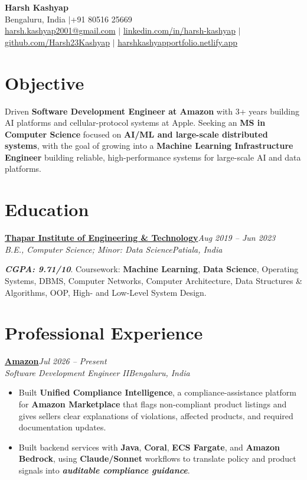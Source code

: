 \documentclass[10pt,a4paper]{article}
\newcommand{\contactsep}{\hspace{0.45em}$\vert$\hspace{0.45em}}
\newcommand{\metric}[1]{\textbf{\textit{#1}}}
\newcommand{\tech}[1]{\textbf{#1}}
\newcommand{\project}[1]{\textbf{#1}}
\newcommand{\entry}[4]{%
  \textbf{\underline{#1}}\hfill\textit{#3}\\%
  \textit{#2}\hfill \textit{#4}\vspace{-1pt}%
}
\begin{document}
\begin{center}
  {\Large \textbf{Harsh Kashyap}}\\
  Bengaluru, India \contactsep +91 80516 25669\\
  \href{mailto:harsh.kashyap2001@gmail.com}{harsh.kashyap2001@gmail.com}
  \contactsep
  \href{https://www.linkedin.com/in/harsh-kashyap}{linkedin.com/in/harsh-kashyap}
  \contactsep
  \href{https://github.com/Harsh23Kashyap}{github.com/Harsh23Kashyap}
  \contactsep
  \href{https://harshkashyapportfolio.netlify.app}{harshkashyapportfolio.netlify.app}
\end{center}

\section{Objective}
Driven \textbf{Software Development Engineer at Amazon} with 3+ years building AI platforms and cellular-protocol systems at Apple. Seeking an \textbf{MS in Computer Science} focused on \textbf{AI/ML and large-scale distributed systems}, with the goal of growing into a \textbf{Machine Learning Infrastructure Engineer} building reliable, high-performance systems for large-scale AI and data platforms.

\section{Education}
\entry{Thapar Institute of Engineering \& Technology}{B.E., Computer Science; Minor: Data Science}{Aug 2019 -- Jun 2023}{Patiala, India}
\metric{CGPA: 9.71/10}. Coursework: \tech{Machine Learning}, \tech{Data Science}, Operating Systems, DBMS, Computer Networks, Computer Architecture, Data Structures \& Algorithms, OOP, High- and Low-Level System Design.

\section{Professional Experience}
\entry{Amazon}{Software Development Engineer II}{Jul 2026 -- Present}{Bengaluru, India}
\begin{itemize}
  \item Built \project{Unified Compliance Intelligence}, a compliance-assistance platform for \tech{Amazon Marketplace} that flags non-compliant product listings and gives sellers clear explanations of violations, affected products, and required documentation updates.
  \item Built backend services with \tech{Java}, \tech{Coral}, \tech{ECS Fargate}, and \tech{Amazon Bedrock}, using \tech{Claude/Sonnet} workflows to translate policy and product signals into \metric{auditable compliance guidance}.
\end{itemize}
\end{document}
